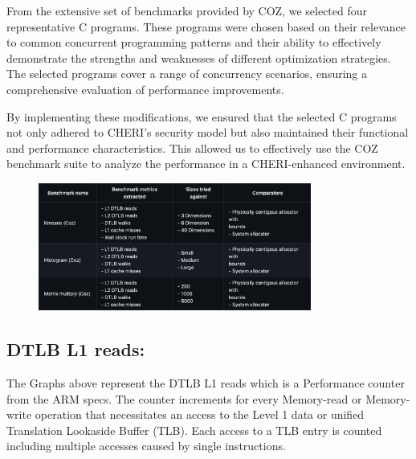 From the extensive set of benchmarks provided by COZ, we selected four representative C programs. 
These programs were chosen based on their relevance to common concurrent programming patterns and
their ability to effectively demonstrate the strengths and weaknesses of different optimization 
strategies. The selected programs cover a range of concurrency scenarios, ensuring a comprehensive
evaluation of performance improvements.

By implementing these modifications, we ensured that the selected C programs not only adhered to
CHERI's security model but also maintained their functional and performance characteristics. 
This allowed us to effectively use the COZ benchmark suite to analyze the performance in a CHERI-enhanced environment.

\begin{figure}[h]
  \includegraphics[width=0.8\textwidth]{diagrams/expirement-runs.png}
\end{figure}

\subsection{DTLB L1 reads:}
The Graphs above represent the DTLB L1 reads which is a Performance counter from the ARM specs. 
The counter increments for every Memory-read or Memory-write operation that necessitates an 
access to the Level 1 data or unified Translation Lookaside Buffer (TLB). 
Each access to a TLB entry is counted including multiple accesses caused by single instructions.


